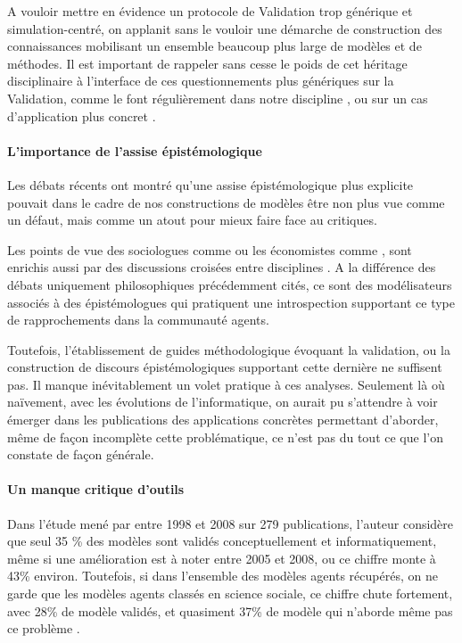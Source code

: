 A vouloir mettre en évidence un protocole de Validation trop générique et simulation-centré, on applanit sans le vouloir une démarche de construction des connaissances mobilisant un ensemble beaucoup plus large de modèles et de méthodes. Il est important de rappeler sans cesse le poids de cet héritage disciplinaire à l'interface de ces questionnements plus génériques sur la Validation, comme le font régulièrement dans notre discipline \textcites{Besse2000, Sanders2000, Mathian2014}, ou sur un cas d'application plus concret \textcites{Cottineau2014a, Cottineau2014b}.

\paragraph{L'importance de l'assise épistémologique}

Les débats récents ont montré qu'une assise épistémologique plus explicite pouvait dans le cadre de nos constructions de modèles être non plus vue comme un défaut, mais comme un atout pour mieux faire face au critiques.

Les points de vue des sociologues comme \autocites{Hedstrom2010, Elsenbroich2012, Squazzoni2010, Manzo2007, Gilbert2009, Conte2001} ou les économistes comme \autocite{Epstein1996, Phan2010}, sont enrichis aussi par des discussions croisées entre disciplines \autocites{Gilbert1995a,Amblard2006, Phan2010a, Livet2014, Varenne2013,Conte2012}. A la différence des débats uniquement philosophiques précédemment cités, ce sont des modélisateurs associés à des épistémologues qui pratiquent une introspection supportant ce type de rapprochements dans la communauté agents.

Toutefois, l'établissement de guides méthodologique évoquant la validation, ou la construction de discours épistémologiques supportant cette dernière ne suffisent pas. Il manque inévitablement un volet pratique à ces analyses. Seulement là où naïvement, avec les évolutions de l'informatique, on aurait pu s'attendre à voir émerger dans les publications des applications concrètes permettant d'aborder, même de façon incomplète cette problématique, ce n'est pas du tout ce que l'on constate de façon générale.

\paragraph{Un manque critique d'outils}

Dans l'étude mené par \textcite{Heath2009} entre 1998 et 2008 sur 279 publications, l'auteur considère que seul 35 \% des modèles sont validés conceptuellement et informatiquement, même si une amélioration est à noter entre 2005 et 2008, ou ce chiffre monte à 43\% environ. Toutefois, si dans l'ensemble des modèles agents récupérés, on ne garde que les modèles agents classés en science sociale, ce chiffre chute fortement, avec 28\% de modèle validés, et quasiment 37\% de modèle qui n'aborde même pas ce problème .

